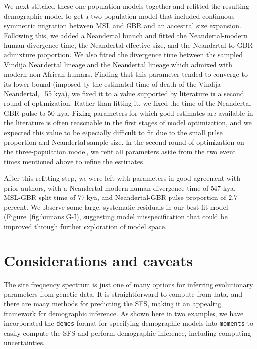 \documentclass[]{article}
\newcommand{\moments}{\texttt{moments}\xspace}
\newcommand{\demes}{\texttt{demes}\xspace}
\begin{document}
We next stitched these one-population models together and refitted the 
resulting demographic model to get a two-population model 
that included continuous symmetric 
migration between MSL and GBR and an ancestral size expansion. Following this,
we added a Neandertal branch and fitted the 
Neandertal-modern human divergence time, the Neandertal effective size, and the 
Neandertal-to-GBR admixture proportion. We also fitted the divergence time 
between the sampled Vindija Neandertal lineage and the Neandertal lineage which 
admixed with modern non-African humans. Finding that this parameter tended to 
converge to its lower bound (imposed by the estimated time of death of the 
Vindija Neandertal, ~55 kya), we fixed it to a value supported by literature 
\citep[90 kya,][]{prufer2017high} in a second round of optimization.
Rather than fitting it, we fixed the time of the Neandertal-GBR pulse to 50 kya.
Fixing parameters for which good estimates are available in the literature 
\citep[see e.g.,][]{sumer2025earliest} is often reasonable in the first stages 
of model optimization, and we expected this value to be especially difficult to 
fit due to the small pulse proportion and Neandertal sample size. In the second 
round of optimization on the three-population model, we refit all parameters 
aside from the two event times mentioned above to refine the estimates. 

After this refitting step, we were left with parameters in good agreement with 
prior authors, with a Neandertal-modern human divergence time of 547 kya, 
MSL-GBR split time of 77 kya, and Neandertal-GBR pulse proportion of 2.7 
percent. We observe some large, systematic residuals in our best-fit model 
(Figure~\ref{fig:humans}G-I), suggesting model misspecification that could be
improved through further exploration of model space.


\section*{Considerations and caveats}\label{sec:conclusions}

The site frequency spectrum is just one of many options for inferring
evolutionary parameters from genetic data. It is straightforward to compute
from data, and there are many methods for predicting the SFS, making it an
appealing framework for demographic inference. As shown here in two examples,
we have incorporated the \demes format for specifying demographic models into
\moments to easily compute the SFS and perform demographic inference, including
computing uncertainties.
\end{document}
